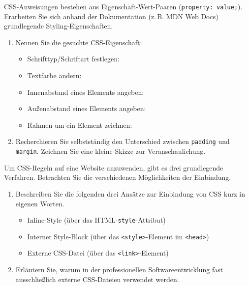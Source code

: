 \documentclass[11pt, a4paper, oneside]{article}
\begin{document}
	\lines[4cm]
	
	
	
	CSS-Anweisungen bestehen aus Eigenschaft-Wert-Paaren (\texttt{property: value;}).
	Erarbeiten Sie sich anhand der Dokumentation (z.\,B. MDN Web Docs) grundlegende Styling-Eigenschaften.
	
	\begin{enumerate}[label=\alph*)]
		\item Nennen Sie die gesuchte CSS-Eigenschaft:
		
		\begin{itemize}
			\itemsep10pt
			\item Schrifttyp/Schriftart festlegen: \hrulefill
			\item Textfarbe ändern: \hrulefill
			\item Innenabstand eines Elements angeben: \hrulefill
			\item Außenabstand eines Elements angeben: \hrulefill
			\item Rahmen um ein Element zeichnen: \hrulefill
		\end{itemize}
		
		\item Recherchieren Sie selbstständig den Unterschied zwischen \texttt{padding} und \texttt{margin}.
		Zeichnen Sie eine kleine Skizze zur Veranschaulichung.
	\end{enumerate}
	
	\boxarea[13cm]
	
	
	
	Um CSS-Regeln auf eine Website anzuwenden, gibt es drei grundlegende Verfahren.
	Betrachten Sie die verschiedenen Möglichkeiten der Einbindung.
	
	\begin{enumerate}[label=\alph*)]
		\item Beschreiben Sie die folgenden drei Ansätze zur Einbindung von CSS kurz in eigenen Worten.
		\begin{itemize}
			\item Inline-Style (über das HTML-\texttt{style}-Attribut)
			\item Interner Style-Block (über das \texttt{<style>}-Element im \texttt{<head>})
			\item Externe CSS-Datei (über das \texttt{<link>}-Element)
		\end{itemize}
		\item Erläutern Sie, warum in der professionellen Softwareentwicklung fast ausschließlich externe CSS-Dateien verwendet werden.
	\end{enumerate}
	
\end{document}
